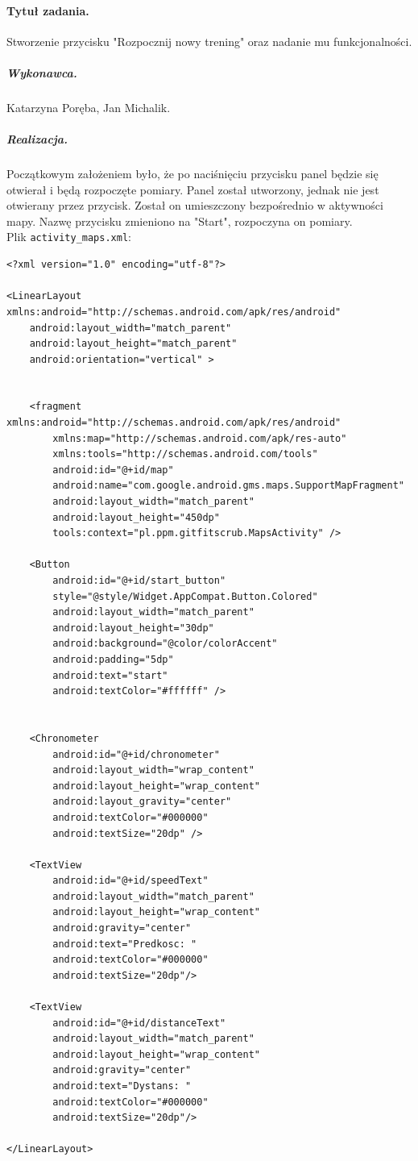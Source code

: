 \documentclass[a4paper]{article}
\begin{document}
\paragraph{Tytuł zadania.} Stworzenie przycisku "Rozpocznij nowy trening" oraz nadanie mu funkcjonalności.
\subparagraph{Wykonawca.} Katarzyna Poręba, Jan Michalik.
\subparagraph{Realizacja.} Początkowym założeniem było, że po naciśnięciu przycisku panel będzie się otwierał i będą rozpoczęte pomiary. Panel został utworzony, jednak nie jest otwierany przez przycisk. Został on umieszczony bezpośrednio w aktywności mapy. Nazwę przycisku zmieniono na "Start", rozpoczyna on pomiary.\\
Plik \verb!activity_maps.xml!:
\begin{lstlisting}[style=xml]
<?xml version="1.0" encoding="utf-8"?>

<LinearLayout xmlns:android="http://schemas.android.com/apk/res/android"
    android:layout_width="match_parent"
    android:layout_height="match_parent"
    android:orientation="vertical" >


    <fragment xmlns:android="http://schemas.android.com/apk/res/android"
        xmlns:map="http://schemas.android.com/apk/res-auto"
        xmlns:tools="http://schemas.android.com/tools"
        android:id="@+id/map"
        android:name="com.google.android.gms.maps.SupportMapFragment"
        android:layout_width="match_parent"
        android:layout_height="450dp"
        tools:context="pl.ppm.gitfitscrub.MapsActivity" />

    <Button
        android:id="@+id/start_button"
        style="@style/Widget.AppCompat.Button.Colored"
        android:layout_width="match_parent"
        android:layout_height="30dp"
        android:background="@color/colorAccent"
        android:padding="5dp"
        android:text="start"
        android:textColor="#ffffff" />


    <Chronometer
        android:id="@+id/chronometer"
        android:layout_width="wrap_content"
        android:layout_height="wrap_content"
        android:layout_gravity="center"
        android:textColor="#000000"
        android:textSize="20dp" />

    <TextView
        android:id="@+id/speedText"
        android:layout_width="match_parent"
        android:layout_height="wrap_content"
        android:gravity="center"
        android:text="Predkosc: "
        android:textColor="#000000"
        android:textSize="20dp"/>

    <TextView
        android:id="@+id/distanceText"
        android:layout_width="match_parent"
        android:layout_height="wrap_content"
        android:gravity="center"
        android:text="Dystans: "
        android:textColor="#000000"
        android:textSize="20dp"/>

</LinearLayout>
\end{lstlisting}
\end{document}
